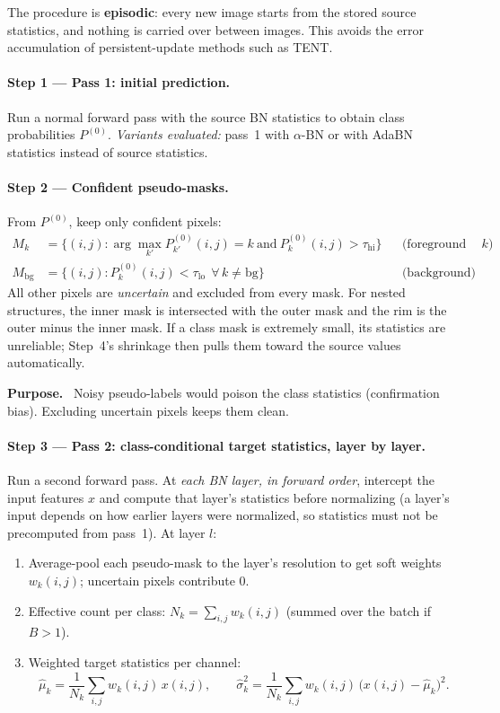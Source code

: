 \documentclass[11pt,a4paper]{article}
\newenvironment{purpose}{\par\smallskip\noindent\textbf{Purpose.}\ }{\par\smallskip}
\begin{document}
The procedure is \textbf{episodic}: every new image starts from the stored source statistics, and nothing is carried over between images. This avoids the error accumulation of persistent-update methods such as TENT.

\paragraph{Step 1 --- Pass 1: initial prediction.}
Run a normal forward pass with the source BN statistics to obtain class probabilities $P^{(0)}$. \emph{Variants evaluated:} pass~1 with $\alpha$-BN or with AdaBN statistics instead of source statistics.

\paragraph{Step 2 --- Confident pseudo-masks.}
From $P^{(0)}$, keep only confident pixels:
\begin{align*}
M_k &= \bigl\{(i,j) : \arg\max_{k'} P^{(0)}_{k'}(i,j) = k \ \text{and}\ P^{(0)}_k(i,j) > \tau_{\mathrm{hi}}\bigr\} && \text{(foreground class } k\text{)}\\
M_{\mathrm{bg}} &= \bigl\{(i,j) : P^{(0)}_k(i,j) < \tau_{\mathrm{lo}}\ \ \forall\, k \neq \mathrm{bg}\bigr\} && \text{(background)}
\end{align*}
All other pixels are \emph{uncertain} and excluded from every mask. For nested structures, the inner mask is intersected with the outer mask and the rim is the outer minus the inner mask. If a class mask is extremely small, its statistics are unreliable; Step~4's shrinkage then pulls them toward the source values automatically.

\begin{purpose}
Noisy pseudo-labels would poison the class statistics (confirmation bias). Excluding uncertain pixels keeps them clean.
\end{purpose}

\paragraph{Step 3 --- Pass 2: class-conditional target statistics, layer by layer.}
Run a second forward pass. At \emph{each BN layer, in forward order}, intercept the input features $x$ and compute that layer's statistics before normalizing (a layer's input depends on how earlier layers were normalized, so statistics must not be precomputed from pass~1). At layer $l$:
\begin{enumerate}
\item Average-pool each pseudo-mask to the layer's resolution to get soft weights $w_k(i,j)$; uncertain pixels contribute $0$.
\item Effective count per class: $N_k = \sum_{i,j} w_k(i,j)$ (summed over the batch if $B>1$).
\item Weighted target statistics per channel:
\begin{equation}
\hat\mu_k = \frac{1}{N_k}\sum_{i,j} w_k(i,j)\,x(i,j), \qquad
\hat\sigma^2_k = \frac{1}{N_k}\sum_{i,j} w_k(i,j)\,\bigl(x(i,j)-\hat\mu_k\bigr)^2 .
\end{equation}
\end{enumerate}
\end{document}
